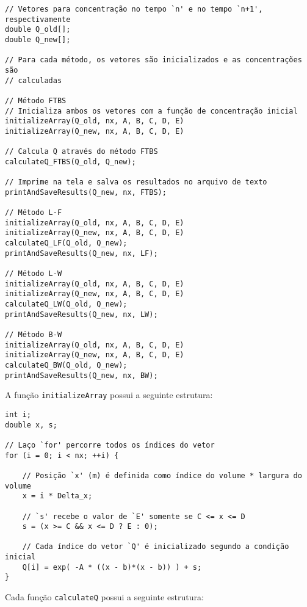 \begin{Verbatim}[fontsize=\footnotesize]
// Vetores para concentração no tempo `n' e no tempo `n+1', respectivamente
double Q_old[];
double Q_new[];

// Para cada método, os vetores são inicializados e as concentrações são
// calculadas

// Método FTBS
// Inicializa ambos os vetores com a função de concentração inicial
initializeArray(Q_old, nx, A, B, C, D, E)
initializeArray(Q_new, nx, A, B, C, D, E)

// Calcula Q através do método FTBS
calculateQ_FTBS(Q_old, Q_new);

// Imprime na tela e salva os resultados no arquivo de texto
printAndSaveResults(Q_new, nx, FTBS);

// Método L-F
initializeArray(Q_old, nx, A, B, C, D, E)
initializeArray(Q_new, nx, A, B, C, D, E)
calculateQ_LF(Q_old, Q_new);
printAndSaveResults(Q_new, nx, LF);

// Método L-W
initializeArray(Q_old, nx, A, B, C, D, E)
initializeArray(Q_new, nx, A, B, C, D, E)
calculateQ_LW(Q_old, Q_new);
printAndSaveResults(Q_new, nx, LW);

// Método B-W
initializeArray(Q_old, nx, A, B, C, D, E)
initializeArray(Q_new, nx, A, B, C, D, E)
calculateQ_BW(Q_old, Q_new);
printAndSaveResults(Q_new, nx, BW);
\end{Verbatim}

\noindent A função \verb|initializeArray| possui a seguinte estrutura:
\begin{Verbatim}[fontsize=\footnotesize]
int i;
double x, s;

// Laço `for' percorre todos os índices do vetor
for (i = 0; i < nx; ++i) {

    // Posição `x' (m) é definida como índice do volume * largura do volume
    x = i * Delta_x;

    // `s' recebe o valor de `E' somente se C <= x <= D
    s = (x >= C && x <= D ? E : 0);

    // Cada índice do vetor `Q' é inicializado segundo a condição inicial
    Q[i] = exp( -A * ((x - b)*(x - b)) ) + s;
}
\end{Verbatim}

\noindent Cada função \verb|calculateQ| possui a seguinte estrutura:

